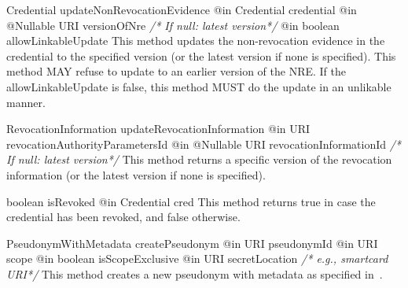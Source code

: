       \begin{method}
      {Credential}
      {updateNonRevocationEvidence}
      {
        {@in Credential credential}
        {@in @Nullable URI versionOfNre \textrm{\textit{/* If null: latest version*/}}}
        {@in boolean allowLinkableUpdate}
      }
      This method updates the non-revocation evidence in the credential to the specified version
      (or the latest version if none is specified). This method MAY refuse to update to an earlier
      version of the NRE. If the allowLinkableUpdate is false, this method MUST do the update in an
      unlikable manner.
      \end{method}  
          
      \begin{method}
      {RevocationInformation}
      {updateRevocationInformation}
      {
        {@in URI revocationAuthorityParametersId}
        {@in @Nullable URI revocationInformationId \textrm{\textit{/* If null: latest version*/}}}
      }
      This method returns a specific version of the revocation information (or the latest version
      if none is specified).
      \end{method}
      
      \begin{method}
      {boolean}
      {isRevoked}
      {
        {@in Credential cred}
      }
      This method returns true in case the credential has been revoked, and false otherwise.
      \end{method}
      
      \begin{method}
      {PseudonymWithMetadata}
      {createPseudonym}
      {
        {@in URI pseudonymId}
        {@in URI scope}
        {@in boolean isScopeExclusive}
        {@in URI secretLocation \textrm{\emph{/* e.g., smartcard URI*/}}}
      }
      This method creates a new pseudonym with metadata as specified in~\cite{abc4trust:h22}.
      \end{method}
      
      
